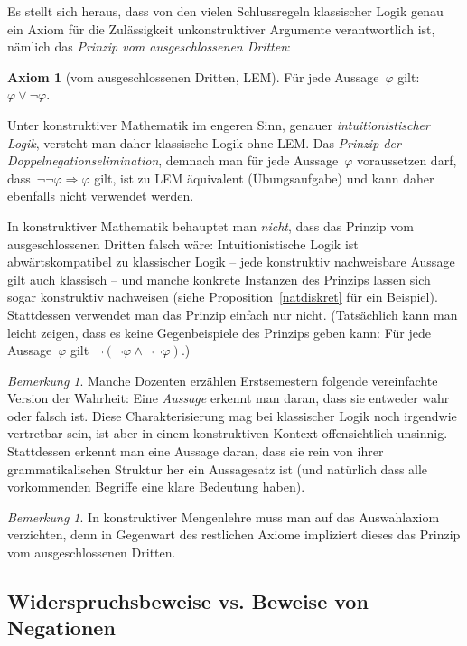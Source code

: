 \documentclass[a4paper,ngerman,12pt]{scrartcl}
\theoremstyle{definition}
\newtheorem{axiom}[defn]{Axiom}
\theoremstyle{plain}
\theoremstyle{remark}
\newtheorem{bem}[defn]{Bemerkung}
\renewcommand{\_}{\mathpunct{.}\,}
\newcommand{\?}{\,{:}\,}
\begin{document}
Es stellt sich heraus, dass von den vielen Schlussregeln klassischer Logik genau
ein Axiom für die Zulässigkeit unkonstruktiver Argumente verantwortlich ist,
nämlich das \emph{Prinzip vom ausgeschlossenen Dritten}:
\begin{axiom}[vom ausgeschlossenen Dritten, LEM]Für jede Aussage~$\varphi$ gilt: $\varphi \vee
\neg\varphi$.\end{axiom}
Unter konstruktiver Mathematik im engeren Sinn, genauer
\emph{intuitionistischer Logik}, versteht man daher klassische Logik ohne LEM.
Das \emph{Prinzip der Doppelnegationselimination}, demnach man für jede
Aussage~$\varphi$ voraussetzen darf, dass~$\neg\neg\varphi \Rightarrow \varphi$
gilt, ist zu LEM äquivalent (Übungsaufgabe) und kann daher ebenfalls nicht
verwendet werden.

In konstruktiver Mathematik behauptet man \emph{nicht}, dass das
Prinzip vom ausgeschlossenen Dritten falsch wäre: Intuitionistische Logik ist
abwärtskompatibel zu klassischer Logik -- jede konstruktiv nachweisbare Aussage
gilt auch klassisch -- und manche konkrete Instanzen des Prinzips lassen sich
sogar konstruktiv nachweisen (siehe Proposition~\ref{natdiskret} für ein Beispiel).
Stattdessen verwendet man das Prinzip einfach
nur nicht. (Tatsächlich kann man leicht zeigen, dass es keine Gegenbeispiele
des Prinzips geben kann: Für jede Aussage~$\varphi$ gilt~$\neg(\neg\varphi
\wedge \neg\neg\varphi)$.)

\begin{bem}Manche Dozenten erzählen Erstsemestern folgende vereinfachte Version
der Wahrheit: Eine \emph{Aussage}
erkennt man daran, dass sie entweder wahr oder falsch ist. Diese
Charakterisierung mag bei klassischer Logik noch irgendwie vertretbar sein, ist aber in
einem konstruktiven Kontext offensichtlich unsinnig. Stattdessen erkennt man
eine Aussage daran, dass sie rein von ihrer grammatikalischen Struktur her ein
Aussagesatz ist (und natürlich dass alle vorkommenden Begriffe eine klare
Bedeutung haben).\end{bem}

\begin{bem}In konstruktiver Mengenlehre muss man auf das Auswahlaxiom
verzichten, denn in Gegenwart des restlichen Axiome impliziert dieses das
Prinzip vom ausgeschlossenen Dritten.\end{bem}


\subsection{Widerspruchsbeweise vs. Beweise von Negationen}
\label{widerspruchvsnegation}
\end{document}
